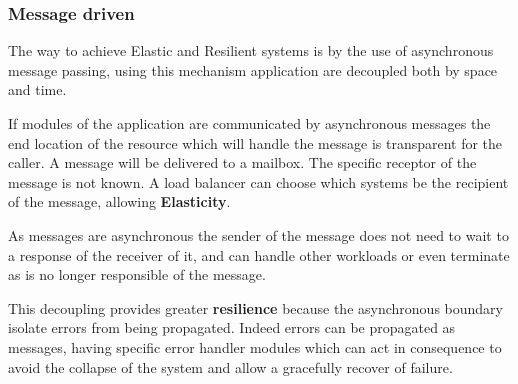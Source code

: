 \documentclass[../main.tex]{subfiles}
\begin{document}
\subsubsection{Message driven}

The way to achieve Elastic and Resilient systems is by the use of asynchronous
message passing, using this mechanism application are decoupled both by space
and time.

If modules of the application are communicated by asynchronous messages the end
location of the resource which will handle the message is transparent for the
caller. A message will be delivered to a mailbox. The specific receptor of the
message is not known. A load balancer can choose which systems be the recipient
of the message, allowing \textbf{Elasticity}.

As messages are asynchronous the sender of the message does not need to wait to
a response of the receiver of it, and can handle other workloads or even
terminate as is no longer responsible of the message.

This decoupling provides greater \textbf{resilience} because the asynchronous
boundary isolate errors from being propagated. Indeed errors can be propagated
as messages, having specific error handler modules which can act in consequence
to avoid the collapse of the system and allow a gracefully recover of failure.
\end{document}
